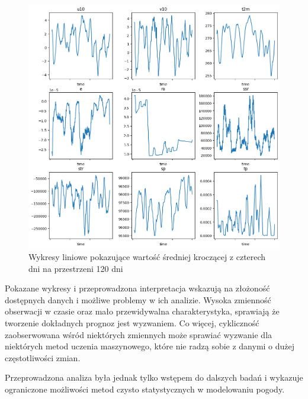 \begin{figure}[H]
    \centering
    \includegraphics[width=\textwidth]{images/line.png}
    \caption{Wykresy liniowe pokazujące wartość średniej kroczącej z czterech dni na przestrzeni 120 dni}
    \label{line}
\end{figure}

Pokazane wykresy i przeprowadzona interpretacja wskazują na złożoność dostępnych danych
i możliwe problemy w ich analizie. Wysoka zmienność obserwacji w czasie oraz mało przewidywalna
charakterystyka, sprawiają że tworzenie dokładnych prognoz jest wyzwaniem. Co więcej, 
cykliczność zaobserwowana wśród niektórych zmiennych może sprawiać wyzwanie dla niektórych
metod uczenia maszynowego, które nie radzą sobie z danymi o dużej częstotliwości zmian. 

Przeprowadzona analiza była jednak tylko wstępem do dalszych badań i wykazuje ograniczone
możliwości metod czysto statystycznych w modelowaniu pogody.